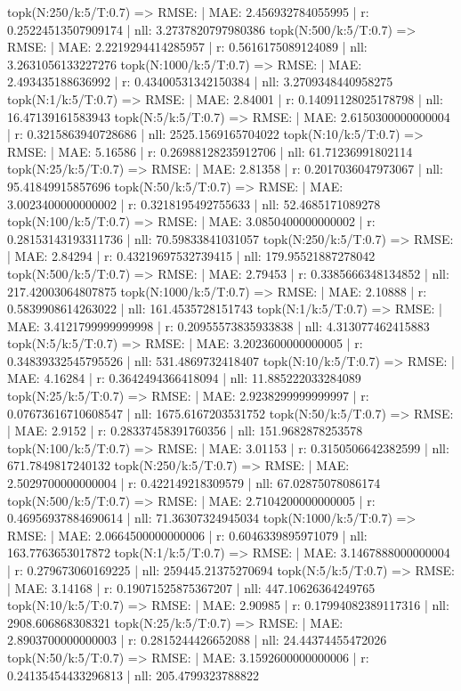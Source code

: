 topk(N:250/k:5/T:0.7) => RMSE: | MAE: 2.456932784055995 | r: 0.25224513507909174 | nll: 3.2737820797980386
topk(N:500/k:5/T:0.7) => RMSE: | MAE: 2.2219294414285957 | r: 0.5616175089124089 | nll: 3.2631056133227276
topk(N:1000/k:5/T:0.7) => RMSE: | MAE: 2.493435188636992 | r: 0.43400531342150384 | nll: 3.2709348440958275
topk(N:1/k:5/T:0.7) => RMSE: | MAE: 2.84001 | r: 0.14091128025178798 | nll: 16.47139161583943
topk(N:5/k:5/T:0.7) => RMSE: | MAE: 2.6150300000000004 | r: 0.3215863940728686 | nll: 2525.1569165704022
topk(N:10/k:5/T:0.7) => RMSE: | MAE: 5.16586 | r: 0.26988128235912706 | nll: 61.71236991802114
topk(N:25/k:5/T:0.7) => RMSE: | MAE: 2.81358 | r: 0.2017036047973067 | nll: 95.41849915857696
topk(N:50/k:5/T:0.7) => RMSE: | MAE: 3.0023400000000002 | r: 0.3218195492755633 | nll: 52.4685171089278
topk(N:100/k:5/T:0.7) => RMSE: | MAE: 3.0850400000000002 | r: 0.28153143193311736 | nll: 70.59833841031057
topk(N:250/k:5/T:0.7) => RMSE: | MAE: 2.84294 | r: 0.43219697532739415 | nll: 179.95521887278042
topk(N:500/k:5/T:0.7) => RMSE: | MAE: 2.79453 | r: 0.3385666348134852 | nll: 217.42003064807875
topk(N:1000/k:5/T:0.7) => RMSE: | MAE: 2.10888 | r: 0.5839908614263022 | nll: 161.4535728151743
topk(N:1/k:5/T:0.7) => RMSE: | MAE: 3.4121799999999998 | r: 0.20955573835933838 | nll: 4.313077462415883
topk(N:5/k:5/T:0.7) => RMSE: | MAE: 3.2023600000000005 | r: 0.34839332545795526 | nll: 531.4869732418407
topk(N:10/k:5/T:0.7) => RMSE: | MAE: 4.16284 | r: 0.3642494366418094 | nll: 11.885222033284089
topk(N:25/k:5/T:0.7) => RMSE: | MAE: 2.9238299999999997 | r: 0.07673616710608547 | nll: 1675.6167203531752
topk(N:50/k:5/T:0.7) => RMSE: | MAE: 2.9152 | r: 0.28337458391760356 | nll: 151.9682878253578
topk(N:100/k:5/T:0.7) => RMSE: | MAE: 3.01153 | r: 0.3150506642382599 | nll: 671.7849817240132
topk(N:250/k:5/T:0.7) => RMSE: | MAE: 2.5029700000000004 | r: 0.422149218309579 | nll: 67.02875078086174
topk(N:500/k:5/T:0.7) => RMSE: | MAE: 2.7104200000000005 | r: 0.46956937884690614 | nll: 71.36307324945034
topk(N:1000/k:5/T:0.7) => RMSE: | MAE: 2.0664500000000006 | r: 0.6046339895971079 | nll: 163.7763653017872
topk(N:1/k:5/T:0.7) => RMSE: | MAE: 3.1467888000000004 | r: 0.279673060169225 | nll: 259445.21375270694
topk(N:5/k:5/T:0.7) => RMSE: | MAE: 3.14168 | r: 0.19071525875367207 | nll: 447.10626364249765
topk(N:10/k:5/T:0.7) => RMSE: | MAE: 2.90985 | r: 0.17994082389117316 | nll: 2908.606868308321
topk(N:25/k:5/T:0.7) => RMSE: | MAE: 2.8903700000000003 | r: 0.2815244426652088 | nll: 24.44374455472026
topk(N:50/k:5/T:0.7) => RMSE: | MAE: 3.1592600000000006 | r: 0.24135454433296813 | nll: 205.4799323788822
